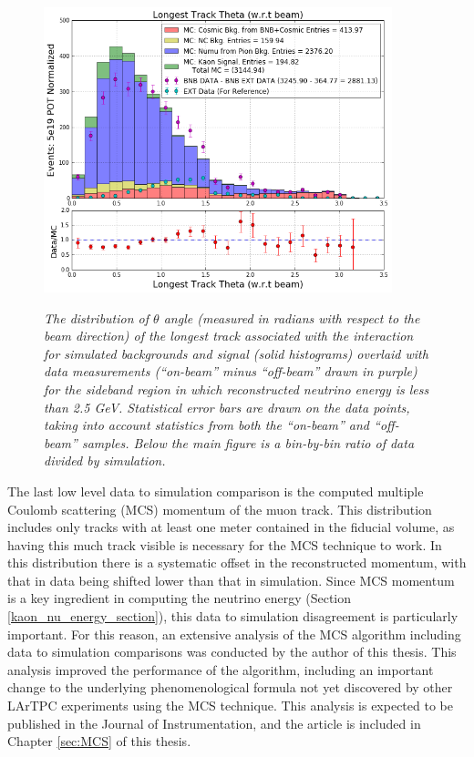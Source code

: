 \begin{figure}[ht!]
\centering
	\includegraphics[width=0.9\textwidth]{Figures/kaon_sideband_comp_theta.png} \\
\caption{\textit{The distribution of $\theta$ angle (measured in radians with respect to the beam direction) of the longest track associated with the interaction for simulated backgrounds and signal (solid histograms) overlaid with data measurements (``on-beam'' minus ``off-beam'' drawn in purple) for the sideband region in which reconstructed neutrino energy is less than 2.5 GeV. Statistical error bars are drawn on the data points, taking into account statistics from both the ``on-beam'' and ``off-beam'' samples. Below the main figure is a bin-by-bin ratio of data divided by simulation.}}\label{kaon_sideband_comp_theta}
\end{figure}

The last low level data to simulation comparison is the computed multiple Coulomb scattering (MCS) momentum of the muon track. This distribution includes only tracks with at least one meter contained in the fiducial volume, as having this much track visible is necessary for the MCS technique to work. In this distribution there is a systematic offset in the reconstructed momentum, with that in data being shifted lower than that in simulation. Since MCS momentum is a key ingredient in computing the neutrino energy (Section \ref{kaon_nu_energy_section}), this data to simulation disagreement is particularly important. For this reason, an extensive analysis of the MCS algorithm including data to simulation comparisons was conducted by the author of this thesis. This analysis improved the performance of the algorithm, including an important change to the underlying phenomenological formula not yet discovered by other LArTPC experiments using the MCS technique. This analysis is expected to be published in the Journal of Instrumentation, and the article is included in Chapter \ref{sec:MCS} of this thesis.\\


